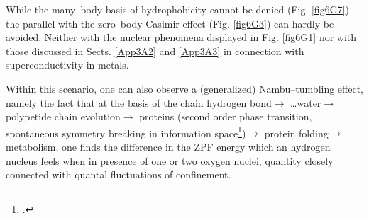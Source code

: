 \begin{subappendices}
While the many--body basis of hydrophobicity cannot be denied (Fig. \ref{fig6G7}) the parallel with the zero--body Casimir effect (Fig. \ref{fig6G3}) can hardly be avoided. Neither with the nuclear phenomena displayed in Fig. \ref{fig6G1} nor with those discussed in Sects. \ref{App3A2} and \ref{App3A3} in connection with superconductivity in metals.


Within this scenario, one can also observe a (generalized) Nambu--tumbling effect, namely the fact that at the basis of the chain hydrogen bond$\to$ \dots water$\to$ polypetide chain evolution$\to$ proteins (second order phase transition, spontaneous symmetry breaking in information space\footnote{\cite{Broglia:13b}.})$\to$ protein folding$\to$ metabolism,  one finds the difference in the ZPF energy which an hydrogen nucleus feels when in presence of one or two oxygen nuclei, quantity closely connected with quantal fluctuations of confinement.
 




\end{subappendices}
\renewcommand{\bibname}{Bibliography Ch 7}

%
 